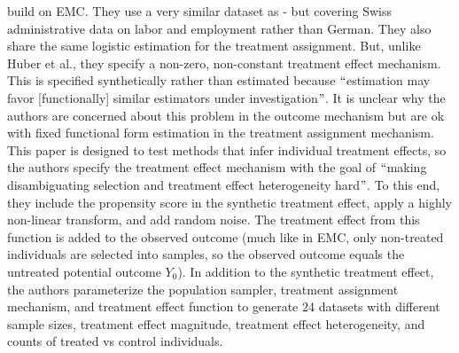 \documentclass[../main.tex]{subfiles}
\begin{document}
\vspace{\baselineskip}
\textcite{Knaus2018MachineEvidence} build on EMC. They use a very similar dataset as \textcite{Huber2013TheScore} - but covering Swiss administrative data on labor and employment rather than German. They also share the same logistic estimation for the treatment assignment. But, unlike Huber et al., they specify a non-zero, non-constant treatment effect mechanism. This is specified synthetically rather than estimated because $``$estimation may favor [functionally] similar estimators under investigation$"$. It is unclear why the authors are concerned about this problem in the outcome mechanism but are ok with fixed functional form estimation in the treatment assignment mechanism. This paper is designed to test methods that infer individual treatment effects, so the authors specify the treatment effect mechanism with the goal of $``$making disambiguating selection and treatment effect heterogeneity hard$"$. To this end, they include the propensity score in the synthetic treatment effect, apply a highly non-linear transform, and add random noise. The treatment effect from this function is added to the observed outcome (much like in EMC, only non-treated individuals are selected into samples, so the observed outcome equals the untreated potential outcome  \( Y_{0} \)). In addition to the synthetic treatment effect, the authors parameterize the population sampler, treatment assignment mechanism, and treatment effect function to generate 24 datasets with different sample sizes, treatment effect magnitude, treatment effect heterogeneity, and counts of treated vs control individuals.\par


\vspace{\baselineskip}

\vspace{\baselineskip}


\end{document}
